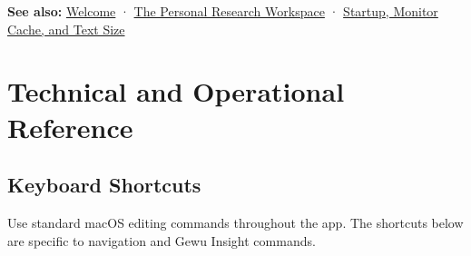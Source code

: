 \documentclass[10pt,letterpaper,oneside]{scrreprt}
\newenvironment{GewuRelated}{\par\nobreak\vspace{3pt}\nobreak\begingroup\small\sffamily\begin{samepage}\noindent}{\par\end{samepage}\endgroup}
\newenvironment{GewuLead}
  {\begin{list}{}{\leftmargin=0pt\rightmargin=0pt\topsep=0pt\partopsep=0pt\parsep=0pt}\item\relax
    \sffamily\fontsize{10.5}{13.2}\selectfont\color{GewuMuted}}
  {\end{list}}
\begin{document}
\begin{GewuRelated}
\textbf{See also:} \hyperref[welcome]{Welcome} · \hyperref[personal-research-workspace]{The Personal Research Workspace} · \hyperref[startup]{Startup, Monitor Cache, and Text Size}
\end{GewuRelated}

\part{Technical and Operational Reference}\label{part-5}

\chapter{Keyboard Shortcuts}\label{keyboard}

\begin{GewuLead}
Use standard macOS editing commands throughout the app. The shortcuts below are specific to navigation and Gewu Insight commands.
\end{GewuLead}
\end{document}
